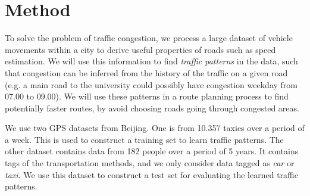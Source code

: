 \section{Method}
To solve the problem of traffic congestion, we process a large dataset of vehicle movements within a city to derive useful properties of roads such as speed estimation. We will use this information to find \emph{traffic patterns} in the data, such that congestion can be inferred from the history of the traffic on a given road (e.g. a main road to the university could possibly have congestion weekday from 07.00 to 09.00). We will use these patterns in a route planning process to find potentially faster routes, by avoid choosing roads going through congested areas.


We use two GPS datasets from Beijing. One is from 10.357 taxies over a period of a week\cite{Tdrive}. This is used to construct a training set to learn traffic patterns. The other dataset contains data from 182 people over a period of 5 years\cite{Geolife}. It contains tags of the transportation methods, and we only consider data tagged as \emph{car} or \emph{taxi}. We use this dataset to construct a test set for evaluating the learned traffic patterns.






